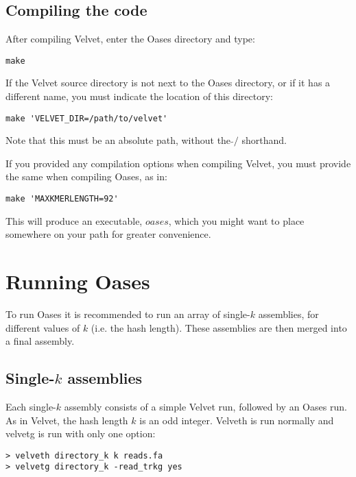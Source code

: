\documentclass[12pt]{article}
\begin{document}
\subsection{Compiling the code}

After compiling Velvet, enter the Oases directory and type:

\begin{verbatim}
make
\end{verbatim}

If the Velvet source directory is not next to the Oases directory, or if it has a different name, you must indicate the location of this directory:

\begin{verbatim}
make 'VELVET_DIR=/path/to/velvet'
\end{verbatim}

Note that this must be an absolute path, without the $\tilde{}/$ shorthand.

If you provided any compilation options when compiling Velvet, you must provide the same when compiling Oases, as in:

\begin{verbatim}
make 'MAXKMERLENGTH=92'
\end{verbatim}

This will produce an executable, $oases$, which you might want to place somewhere on your path for greater convenience.

\section{Running Oases}

To run Oases it is recommended to run an array of single-$k$ assemblies, for different values of $k$ (i.e. the hash length). These assemblies are then merged into a final assembly. 

\subsection{Single-$k$ assemblies}

Each single-$k$ assembly consists of a simple Velvet run, followed by an Oases run. As in Velvet, the hash length $k$ is an odd integer. Velveth is run normally and velvetg is run with only one option:

\begin{verbatim}
> velveth directory_k k reads.fa
> velvetg directory_k -read_trkg yes
\end{verbatim}
\end{document}

